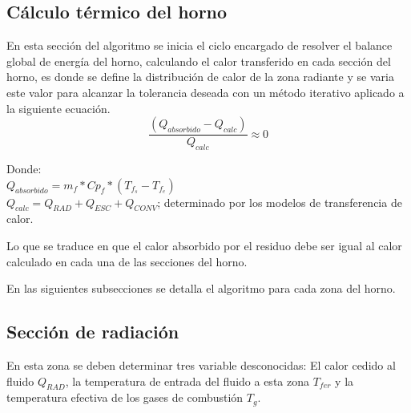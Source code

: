 \subsection{Cálculo térmico del horno}
\par En esta sección del algoritmo se inicia el ciclo encargado de resolver el balance global de energía del horno, calculando el calor transferido en cada sección del horno, es donde se define la distribución de calor de la zona radiante y se varia este valor para alcanzar la tolerancia deseada con un método iterativo aplicado a la siguiente ecuación.
\begin{equation}
\label{eq:ciclo_externo}
\frac{(Q_{absorbido} - Q_{calc})}{Q_{calc}} \approx 0
\end{equation}
\par Donde:\\
$Q_{absorbido} = m_{f} * Cp_{f} * (T_{f_s}-T_{f_e})$ \\
$Q_{calc} = Q_{RAD} + Q_{ESC} + Q_{CONV}$; determinado por los modelos de transferencia de calor.
\par Lo que se traduce en que el calor absorbido por el residuo debe ser igual al calor calculado en cada una de las secciones del horno.
\par En las siguientes subsecciones se detalla el algoritmo para cada zona del horno.

\subsection{Sección de radiación}
\par En esta zona se deben determinar tres variable desconocidas: El calor cedido al fluido $Q_{RAD}$, la temperatura de entrada del fluido a esta zona $T_{fer}$ y la temperatura efectiva de los gases de combustión $T_g$.

